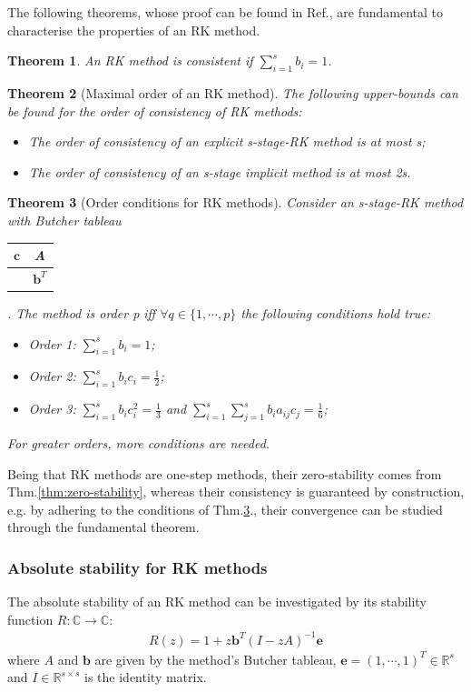 \documentclass[11pt]{article}
\theoremstyle{theorem}
\newtheorem{theorem}{Theorem}
\theoremstyle{definition}
\begin{document}
The following theorems, whose proof can be found in Ref.\cite{lec-notes}, are fundamental to characterise the properties of an RK method.\\

\begin{theorem}
	\label{thm:consistency-RK}
	An RK method is consistent if $\sum_{i=1}^{s}b_i=1$.
\end{theorem}

\begin{theorem}[Maximal order of an RK method]
	\label{thm:order-RK}
	The following upper-bounds can be found for the order of consistency of RK methods:
	\begin{itemize}
		\item The order of consistency of an explicit s-stage-RK method is at most s;
		\item The order of consistency of an s-stage implicit method is at most 2s.
	\end{itemize}
\end{theorem}

\begin{theorem}[Order conditions for RK methods]
	\label{thm:order-cond-RK}
	Consider an s-stage-RK method with Butcher tableau 
	\begin{tabular}{c|c}
		$\mathbf{c}$ & A  \\
		\hline
		& $\mathbf{b}^T$ \\
	\end{tabular}
	. The method is order p iff $\forall q\in\lbrace 1,\cdots, p\rbrace$ the following conditions hold true:
	\begin{itemize}
		\item Order 1: $\sum_{i=1}^{s}b_i=1$;
		\item Order 2: $\sum_{i=1}^{s}b_ic_i=\frac{1}{2}$;
		\item Order 3: $\sum_{i=1}^{s}b_ic_i^2=\frac{1}{3}$ and $\sum_{i=1}^{s}\sum_{j=1}^{s}b_ia_{ij}c_j=\frac{1}{6}$;
	\end{itemize}
	For greater orders, more conditions are needed.\\
\end{theorem}

Being that RK methods are one-step methods, their zero-stability comes from Thm.\ref{thm:zero-stability}, whereas their consistency is guaranteed by construction,
e.g. by adhering to the conditions of Thm.\ref{thm:order-cond-RK}., their convergence can be studied through the fundamental theorem.\\
\subsubsection{Absolute stability for RK methods}
The absolute stability of an RK method can be investigated by its stability function
$R:\mathbb{C}\rightarrow\mathbb{C}$:
\begin{align}
	\label{eqn:R}
	R(z)= 1+z\mathbf{b}^T(I-zA)^{-1}\mathbf{e}
\end{align}
where $A$ and $\mathbf{b}$ are given by the method's Butcher tableau, $\mathbf{e}=(1,\cdots, 1)^T\in\mathbb{R}^s$ and $I\in\mathbb{R}^{s\times s}$ is the identity matrix.
\end{document}
